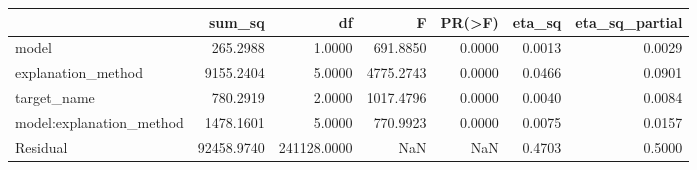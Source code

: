 \begin{tabular}{lrrrrrr}
\toprule
 & sum_sq & df & F & PR(>F) & eta_sq & eta_sq_partial \\
\midrule
model & 265.2988 & 1.0000 & 691.8850 & 0.0000 & 0.0013 & 0.0029 \\
explanation_method & 9155.2404 & 5.0000 & 4775.2743 & 0.0000 & 0.0466 & 0.0901 \\
target_name & 780.2919 & 2.0000 & 1017.4796 & 0.0000 & 0.0040 & 0.0084 \\
model:explanation_method & 1478.1601 & 5.0000 & 770.9923 & 0.0000 & 0.0075 & 0.0157 \\
Residual & 92458.9740 & 241128.0000 & NaN & NaN & 0.4703 & 0.5000 \\
\bottomrule
\end{tabular}
